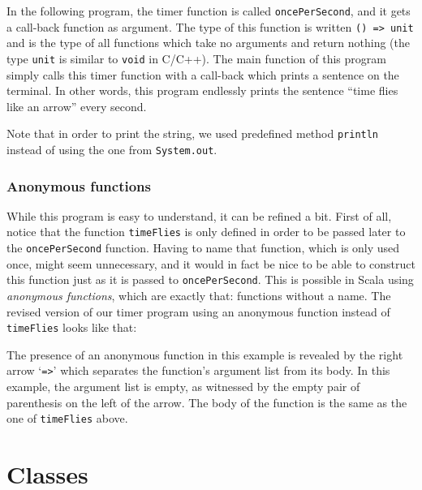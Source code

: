\documentclass[a4paper,12pt,twoside,titlepage]{article}
\begin{document}
In the following program, the timer function is called
\lstinline?oncePerSecond?, and it gets a call-back function as argument.
The type of this function is written \verb|() => unit| and is the type
of all functions which take no arguments and return nothing (the type
\lstinline?unit? is similar to \lstinline?void? in C/C++). The main function of
this program simply calls this timer function with a call-back which
prints a sentence on the terminal. In other words, this program
endlessly prints the sentence ``time flies like an arrow'' every
second.

Note that in order to print the string, we used predefined method
\lstinline?println? instead of using the one from \lstinline?System.out?.

\subsubsection{Anonymous functions}
\label{sec:anonymous-functions}

While this program is easy to understand, it can be refined a bit.
First of all, notice that the function \lstinline?timeFlies? is only
defined in order to be passed later to the \lstinline?oncePerSecond?
function. Having to name that function, which is only used once, might
seem unnecessary, and it would in fact be nice to be able to construct
this function just as it is passed to \lstinline?oncePerSecond?. This is
possible in Scala using \emph{anonymous functions}, which are exactly
that: functions without a name. The revised version of our timer
program using an anonymous function instead of \lstinline?timeFlies? looks
like that:

The presence of an anonymous function in this example is revealed by
the right arrow `\verb|=>|' which separates the function's argument
list from its body. In this example, the argument list is empty, as
witnessed by the empty pair of parenthesis on the left of the arrow.
The body of the function is the same as the one of \lstinline?timeFlies?
above.


\section{Classes}
\label{sec:classes}
\end{document}
